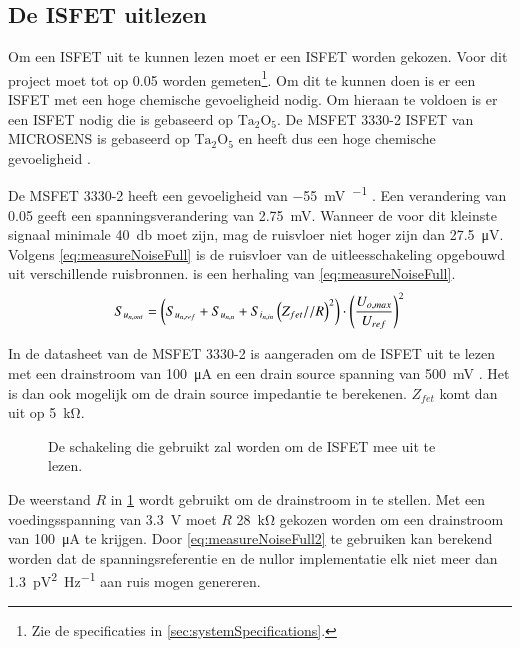 \subsection{De ISFET uitlezen}
Om een ISFET uit te kunnen lezen moet er een ISFET worden gekozen. Voor dit project moet \si{\pH} tot op \qty{0.05}{\pH} worden gemeten\footnote{Zie de specificaties in \cref{sec:systemSpecifications}.}. Om dit te kunnen doen is er een ISFET met een hoge chemische gevoeligheid nodig. Om hieraan te voldoen is er een ISFET nodig die is gebaseerd op $\mathrm{Ta_2O_5}$. De MSFET 3330-2 ISFET van MICROSENS is gebaseerd op $\mathrm{Ta_2O_5}$ en heeft dus een hoge chemische gevoeligheid \cite{bergveld2003thirtyYearsISFET,bergveld1985impactOfMosfetBasedSensors,isfet}.

De MSFET 3330-2 heeft een gevoeligheid van \qty{-55}{\milli\volt\pH^{-1}} \cite{isfet}. Een verandering van \qty{0.05}{\pH} geeft een spanningsverandering van \qty{2.75}{\milli\volt}. Wanneer de \SNR voor dit kleinste signaal minimale \qty{40}{\decibel} moet zijn, mag de ruisvloer niet hoger zijn dan \qty{27.5}{\micro\volt}. Volgens \cref{eq:measureNoiseFull} is de ruisvloer van de uitleesschakeling opgebouwd uit verschillende ruisbronnen.  is een herhaling van \cref{eq:measureNoiseFull}.
\begin{equation}\label{eq:measureNoiseFull2}
    S_{u_{{n,out}}} = \left(S_{u_{{n,ref}}} + S_{u_{{n,n}}} + S_{i_{{n,in}}}\left(Z_{fet} // R\right)^2\right) \cdot \left(\frac{U_{o,max}}{U_{ref}}\right)^2
    \tagaddtext{[\si{\volt\squared\per\hertz}]}
\end{equation}

In de datasheet van de MSFET 3330-2 is aangeraden om de ISFET uit te lezen met een drainstroom van \qty{100}{\micro\ampere} en een drain source spanning van \qty{500}{\milli\volt} \cite{isfet}. Het is dan ook mogelijk om de drain source impedantie te berekenen. $Z_{fet}$ komt dan uit op \qty{5}{\kilo\ohm}.
\begin{figure}[!htb]
    \centering
    \def\svgwidth{0.4\textwidth}
    
    \caption{De schakeling die gebruikt zal worden om de ISFET mee uit te lezen.}
    \label{fig:measureResistorImplementatie}
\end{figure}
De weerstand $R$ in \cref{fig:measureResistorImplementatie} wordt gebruikt om de drainstroom in te stellen. Met een voedingsspanning van \qty{3.3}{\volt} moet $R$ \qty{28}{\kilo\ohm} gekozen worden om een drainstroom van \qty{100}{\micro\ampere} te krijgen. Door \cref{eq:measureNoiseFull2} te gebruiken kan berekend worden dat de spanningsreferentie en de nullor implementatie elk niet meer dan \qty{1.3}{\pico\volt^2\hertz^{-1}} aan ruis mogen genereren.

